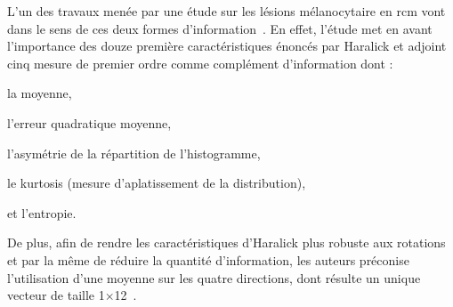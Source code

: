 L'un des travaux menée par une étude sur les lésions mélanocytaire en \gls{rcm} vont dans le sens de ces deux formes d'information~\cite{Wiltgen2008}. En effet, l'étude met en avant l'importance des douze première caractéristiques énoncés par Haralick et adjoint cinq mesure de premier ordre comme complément d'information dont :
\begin{inlinerate}
    \item la moyenne,
    \item l'erreur quadratique moyenne,
    \item l'asymétrie de la répartition de l'histogramme,
    \item le kurtosis (mesure d'aplatissement de la distribution),
    \item et l'entropie.
\end{inlinerate}
De plus, afin de rendre les caractéristiques d'Haralick plus robuste aux rotations et par la même de réduire la quantité d'information, les auteurs préconise l'utilisation d'une moyenne sur les quatre directions, dont résulte un unique vecteur de taille 1$\times$12~\cite{Wiltgen2008}.\par

